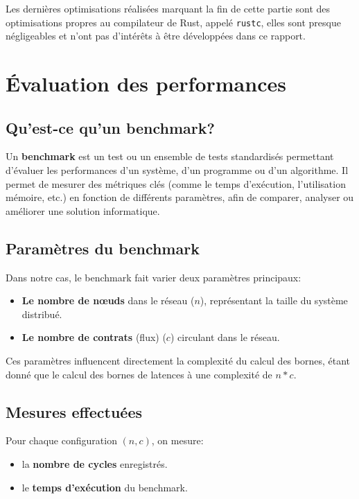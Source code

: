 \documentclass[12pt]{report}
\begin{document}
\bigskip

Les dernières optimisations réalisées marquant la fin de cette
partie sont des optimisations propres au compilateur de Rust,
appelé \texttt{rustc}, elles sont presque négligeables et
n'ont pas d'intérêts à être développées dans ce rapport. 


\chapter{Évaluation des performances}
\section{Qu'est-ce qu'un benchmark?}

Un \textbf{benchmark} est un test ou un ensemble de tests 
standardisés permettant d'évaluer les performances d'un système, 
d'un programme ou d'un algorithme. Il permet de mesurer des 
métriques clés (comme le temps d'exécution, l'utilisation mémoire, 
etc.) en fonction de différents paramètres, afin de comparer, 
analyser ou améliorer une solution informatique.

\section*{Paramètres du benchmark}

Dans notre cas, le benchmark fait varier deux paramètres principaux:
\begin{itemize}
    \item \textbf{Le nombre de nœuds} dans le réseau ($n$), représentant la taille du système distribué.
    \item \textbf{Le nombre de contrats} (flux) ($c$) circulant dans le réseau.
\end{itemize}

Ces paramètres influencent directement la complexité du calcul 
des bornes, étant donné que le calcul des bornes de latences
à une complexité de $n*c$.

\section*{Mesures effectuées}

Pour chaque configuration $(n, c)$, on mesure:
\begin{itemize}
    \item la \textbf{nombre de cycles} enregistrés.
    \item le \textbf{temps d'exécution} du benchmark.
\end{itemize}
\end{document}
